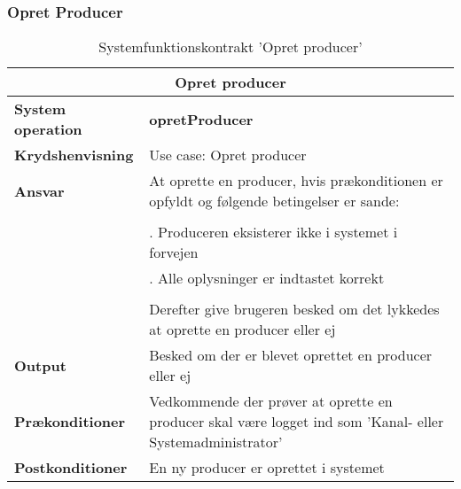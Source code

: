 \subsubsection{Opret Producer}
\begin{table}[H]
    \centering
    \begin{tabular}{| p{4cm} | p{12cm} |}
    \hline
    \multicolumn{2}{|c|}{\textbf{Opret producer}}\\
    \hline
    \textbf{System operation}       & \textbf{opretProducer} \\ \hline
    \textbf{Krydshenvisning}        & Use case: Opret producer \\ \hline\textbf{}
    \textbf{Ansvar}                 & At oprette en producer, hvis prækonditionen er opfyldt og følgende betingelser er sande: \\ 
                                    & \\ 
                                    & \quad 1. Produceren eksisterer ikke i systemet i forvejen \\
                                    & \quad 2. Alle oplysninger er indtastet korrekt \\
                                    & \\
                                    & Derefter give brugeren besked om det lykkedes at oprette en producer eller ej \\\hline
    \textbf{Output}                 & Besked om der er blevet oprettet en producer eller ej \\ \hline
    \textbf{Prækonditioner}         & Vedkommende der prøver at oprette en producer skal være logget ind som 'Kanal- eller                                                  Systemadministrator' \\ \hline
    \textbf{Postkonditioner}        & En ny producer er oprettet i systemet \\ \hline
    \end{tabular}
    \caption{Systemfunktionskontrakt 'Opret producer'}
    \label{tab:kontrakter_opret_producer}
\end{table}


